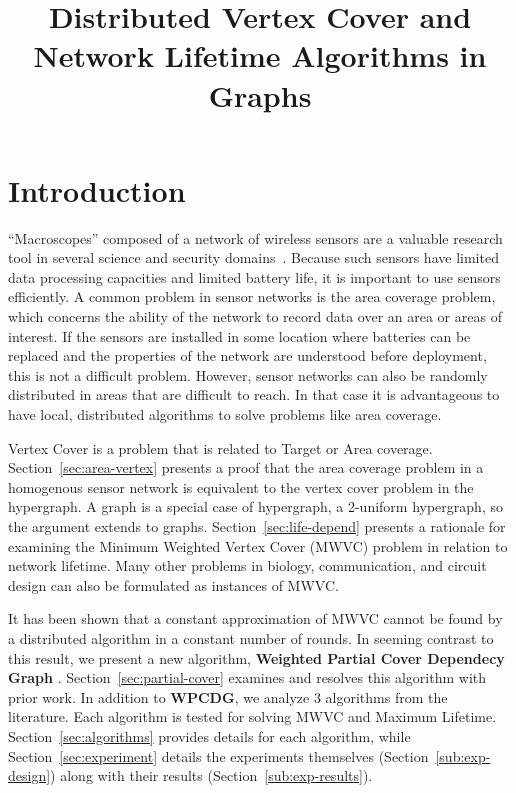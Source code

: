 

\title{Distributed Vertex Cover and Network Lifetime Algorithms in Graphs} 

\author{
}

\maketitle

\section{Introduction}
``Macroscopes'' composed of a network of wireless sensors are a valuable research tool in several science and security domains~\cite{1098925,990703}. Because such sensors have limited data processing capacities and limited battery life, it is important to use sensors efficiently. A common problem in sensor networks is the area coverage problem, which concerns the ability of the network to record data over an area or areas of interest. If the sensors are installed in some location where batteries can be replaced and the properties of the network are understood before deployment, this is not a difficult problem. However, sensor networks can also be randomly distributed in areas that are difficult to reach. In that case it is advantageous to have local, distributed algorithms to solve problems like area coverage.

Vertex Cover is a problem that is related to Target or Area coverage. Section~\ref{sec:area-vertex} presents a proof that the area coverage problem in a homogenous sensor network is equivalent to the vertex cover problem in the hypergraph. A graph is a special case of hypergraph, a 2-uniform hypergraph, so the argument extends to graphs. Section~\ref{sec:life-depend} presents a rationale for examining the Minimum Weighted Vertex Cover (MWVC) problem in relation to network lifetime. Many other problems in biology, communication, and circuit design can also be formulated as instances of MWVC.

It has been shown that a constant approximation of MWVC cannot be found by a distributed algorithm in a constant number of rounds.\cite{1011811} In seeming contrast to this result, we present a new algorithm, {\bf Weighted Partial Cover Dependecy Graph} . Section~\ref{sec:partial-cover} examines and resolves this algorithm with prior work. In addition to {\bf WPCDG}, we analyze 3 algorithms from the literature. Each algorithm is tested for solving MWVC and Maximum Lifetime. Section~\ref{sec:algorithms} provides details for each algorithm, while Section~\ref{sec:experiment} details the experiments themselves (Section~\ref{sub:exp-design}) along with their results (Section~\ref{sub:exp-results}).
